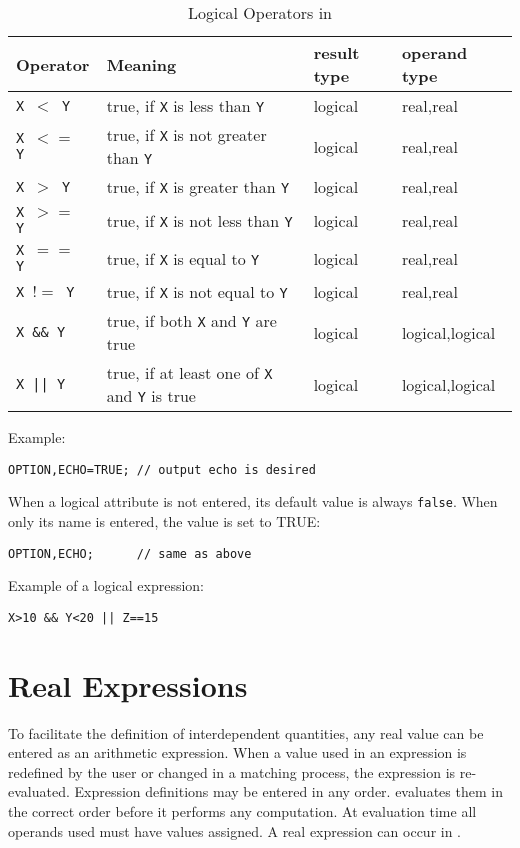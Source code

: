 \begin{table}[ht]
  \caption{Logical Operators in \opal}
  \label{tab:logoperator}
  \begin{center}
    \begin{tabular}{|l|p{}|l|l|}
      \hline
      Operator & Meaning & result type & operand type \\
      \hline
      \texttt{X $<$ Y} & true, if \texttt{X} is less than \texttt{Y} &
      logical &real,real \\
      \texttt{X $<=$ Y} & true, if \texttt{X} is not greater than \texttt{Y} &
      logical &real,real \\
      \texttt{X $>$ Y} & true, if \texttt{X} is greater than \texttt{Y} &
      logical &real,real \\
      \texttt{X $>=$ Y} & true, if \texttt{X} is not less than \texttt{Y} &
      logical &real,real \\
      \texttt{X $==$ Y} & true, if \texttt{X} is equal to \texttt{Y} &
      logical &real,real \\
      \texttt{X $!=$ Y} & true, if \texttt{X} is not equal to \texttt{Y} &
      logical &real,real \\
      \texttt{X \&\& Y} & true, if both \texttt{X} and \texttt{Y} are true &
      logical &logical,logical \\
      \texttt{X || Y} &
      true, if at least one of \texttt{X} and \texttt{Y} is true &
      logical &logical,logical \\
      \hline
    \end{tabular}
  \end{center}
\end{table}
\par
\noindent Example:
\begin{verbatim}
OPTION,ECHO=TRUE; // output echo is desired
\end{verbatim}
When a logical attribute is not entered, 
its default value is always \texttt{false}.
When only its name is entered, the value is set to TRUE:
\begin{verbatim}
OPTION,ECHO;      // same as above
\end{verbatim}
\noindent Example of a logical expression:
\begin{verbatim}
X>10 && Y<20 || Z==15
\end{verbatim}

\section{Real Expressions}
\label{sec:areal}
To facilitate the definition of interdependent quantities,
any real value can be entered as an arithmetic expression.
When a value used in an expression is redefined by the user
or changed in a matching process,
the expression is re-evaluated.
Expression definitions may be entered in any order.
\opal evaluates them in the correct order before it performs
any computation.
At evaluation time all operands used must have values assigned.
A real expression can occur in .

